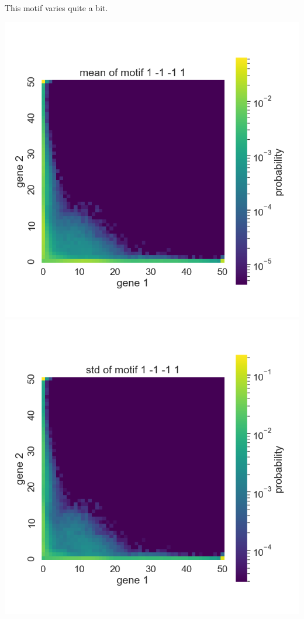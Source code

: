 \documentclass[
]{article}
\begin{document}
This motif varies quite a bit.

\includegraphics{../analysis/eda/first-set-heatmaps/summaries/57-mean.png}
\includegraphics{../analysis/eda/first-set-heatmaps/summaries/57-std.png}
\end{document}
